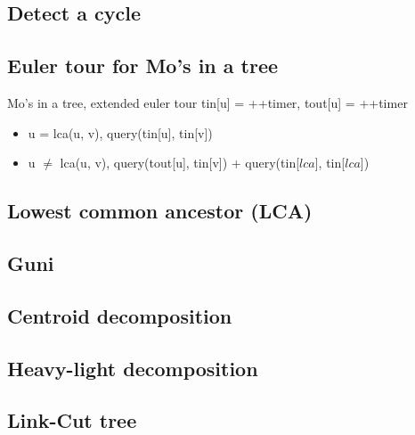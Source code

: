 \subsection{Detect a cycle}

\subsection{Euler tour for Mo's in a tree}
\vspace{-5pt}
Mo's in a tree, extended euler tour \small{tin[u] = ++timer, tout[u] = ++timer} 
\vspace{-5pt}
\begin{itemize}[noitemsep]
  \item u = lca(u, v), query(tin[u], tin[v]) 
  \item u $\neq$ lca(u, v), query(tout[u], tin[v]) + query(tin[$lca$], tin[$lca$])
\end{itemize}
\vspace{-10pt}

\subsection{Lowest common ancestor (LCA)}

\subsection{Guni}

\subsection{Centroid decomposition}

\subsection{Heavy-light decomposition}

\subsection{Link-Cut tree}
